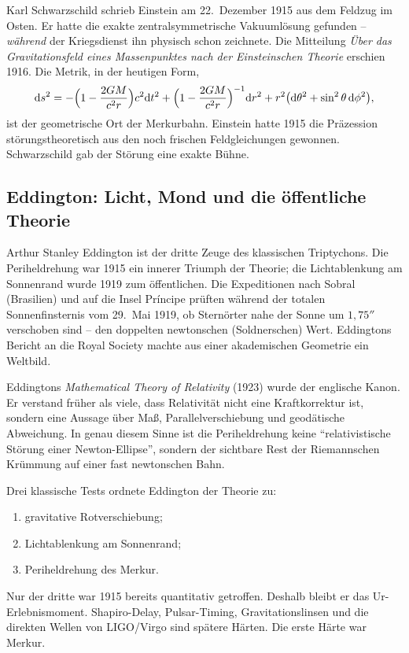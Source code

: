 \documentclass[11pt,a4paper]{article}
\theoremstyle{definition}
\theoremstyle{remark}
\begin{document}
Karl Schwarzschild schrieb Einstein am 22.~Dezember 1915 aus dem Feldzug im Osten. Er hatte die exakte zentralsymmetrische Vakuumlösung gefunden -- \emph{während} der Kriegsdienst ihn physisch schon zeichnete. Die Mitteilung \emph{Über das Gravitationsfeld eines Massenpunktes nach der Einsteinschen Theorie} erschien 1916. Die Metrik, in der heutigen Form,
\begin{equation}
\label{eq:schwarzschild}
\mathrm{d}s^2=-\Bigl(1-\frac{2GM}{c^2 r}\Bigr)c^2\mathrm{d}t^2
+\Bigl(1-\frac{2GM}{c^2 r}\Bigr)^{-1}\mathrm{d}r^2
+r^2\bigl(\mathrm{d}\theta^2+\sin^2\theta\,\mathrm{d}\phi^2\bigr),
\end{equation}
ist der geometrische Ort der Merkurbahn. Einstein hatte 1915 die Präzession störungstheoretisch aus den noch frischen Feldgleichungen gewonnen. Schwarzschild gab der Störung eine exakte Bühne.

\subsection{Eddington: Licht, Mond und die öffentliche Theorie}

Arthur Stanley Eddington ist der dritte Zeuge des klassischen Triptychons. Die Periheldrehung war 1915 ein innerer Triumph der Theorie; die Lichtablenkung am Sonnenrand wurde 1919 zum öffentlichen. Die Expeditionen nach Sobral (Brasilien) und auf die Insel Príncipe prüften während der totalen Sonnenfinsternis vom 29.~Mai 1919, ob Sternörter nahe der Sonne um \(1{,}75''\) verschoben sind -- den doppelten newtonschen (Soldnerschen) Wert. Eddingtons Bericht an die Royal Society machte aus einer akademischen Geometrie ein Weltbild.

Eddingtons \emph{Mathematical Theory of Relativity} (1923) wurde der englische Kanon. Er verstand früher als viele, dass Relativität nicht eine Kraftkorrektur ist, sondern eine Aussage über Maß, Parallelverschiebung und geodätische Abweichung. In genau diesem Sinne ist die Periheldrehung keine \enquote{relativistische Störung einer Newton-Ellipse}, sondern der sichtbare Rest der Riemannschen Krümmung auf einer fast newtonschen Bahn.

Drei klassische Tests ordnete Eddington der Theorie zu:
\begin{enumerate}
  \item gravitative Rotverschiebung;
  \item Lichtablenkung am Sonnenrand;
  \item Periheldrehung des Merkur.
\end{enumerate}
Nur der dritte war 1915 bereits quantitativ getroffen. Deshalb bleibt er das Ur-Erlebnismoment. Shapiro-Delay, Pulsar-Timing, Gravitationslinsen und die direkten Wellen von LIGO/Virgo sind spätere Härten. Die erste Härte war Merkur.
\end{document}
